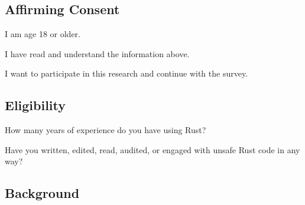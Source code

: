 \subsection{Affirming Consent}
\label{survey:sec:cq}
\begin{protocol}
\item \label{survey:cq1}  I am age 18 or older.

\item \label{survey:cq2}  I have read and understand the information above.

\item \label{survey:cq3}  I want to participate in this research and continue with the survey.
\end{protocol}

\subsection{Eligibility}
\label{survey:sec:elq}

\begin{protocol}
\item \label{survey:elq1}  How many years of experience do you have using Rust?

\item \label{survey:elq2}  Have you written, edited, read, audited, or engaged with unsafe Rust code in any way?
\end{protocol}

\subsection{Background}
\label{survey:sec:bq}

